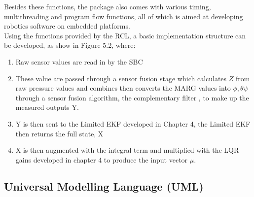 \documentclass[12pt,a4paper,twoside]{report}
\begin{document}
				Besides these functions, the package also comes with various timing, multithreading and program flow functions, all of which is aimed at developing robotics software on embedded platforms.
				\\
				Using the functions provided by the RCL, a basic implementation structure can be developed, as show in Figure 5.2, where:
				\\
				\begin{enumerate}
					\item 
						Raw sensor values are read in by the SBC
					\item 
						These value are passed through a sensor fusion stage which calculates $Z$ from raw pressure values and combines then converts the MARG values into $\phi,\theta\psi$ through a sensor fusion algorithm, the complementary filter \cite{20}, to make up the measured outputs Y.
					\item 
						Y is then sent to the Limited EKF developed in Chapter 4, the Limited EKF then returns the full state, X
					\item 
						X is then augmented with the integral term and multiplied with the LQR gains developed in chapter 4 to produce the input vector $\mu$.
				\end{enumerate}
			
			\subsection{Universal Modelling Language (UML)}
			
\end{document}
